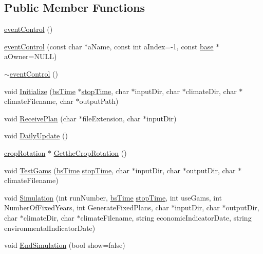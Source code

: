 \subsection*{Public Member Functions}
\begin{DoxyCompactItemize}
\item 
\hyperlink{classevent_control_a2e603f04482f16adc39d44adeb835aea}{eventControl} ()
\item 
\hyperlink{classevent_control_aa1a3811220714c42da10044e57034b7d}{eventControl} (const char $\ast$aName, const int aIndex=-\/1, const \hyperlink{classbase}{base} $\ast$aOwner=NULL)
\item 
\hyperlink{classevent_control_a9c9efcb383c5839f410c676e1379cfb3}{$\sim$eventControl} ()
\item 
void \hyperlink{classevent_control_abc86856c0212792527d036ac7cca53fb}{Initialize} (\hyperlink{classbs_time}{bsTime} $\ast$\hyperlink{bstime_8h_ab9daf2a60923b76e095ced77ee8785e3}{stopTime}, char $\ast$inputDir, char $\ast$climateDir, char $\ast$climateFilename, char $\ast$outputPath)
\item 
void \hyperlink{classevent_control_a47e163a529ae0e98fd83a31410731cde}{ReceivePlan} (char $\ast$fileExtension, char $\ast$inputDir)
\item 
void \hyperlink{classevent_control_a8fedd9f0953e05cbd39009bdd0b80387}{DailyUpdate} ()
\item 
\hyperlink{classcrop_rotation}{cropRotation} $\ast$ \hyperlink{classevent_control_aca3970196c2b30a5aa4a72952f829f20}{GettheCropRotation} ()
\item 
void \hyperlink{classevent_control_a4c270645b2751ad6c40fccd245455689}{TestGams} (\hyperlink{classbs_time}{bsTime} \hyperlink{bstime_8h_ab9daf2a60923b76e095ced77ee8785e3}{stopTime}, char $\ast$inputDir, char $\ast$outputDir, char $\ast$climateFilename)
\item 
void \hyperlink{classevent_control_a8def131d92f231393e486f28ff0cf00c}{Simulation} (int runNumber, \hyperlink{classbs_time}{bsTime} \hyperlink{bstime_8h_ab9daf2a60923b76e095ced77ee8785e3}{stopTime}, int useGams, int NumberOfFixedYears, int GenerateFixedPlans, char $\ast$inputDir, char $\ast$outputDir, char $\ast$climateDir, char $\ast$climateFilename, string economicIndicatorDate, string environmentalIndicatorDate)
\item 
void \hyperlink{classevent_control_a6f376cef3f9304a16b1d633ea4ac4770}{EndSimulation} (bool show=false)
\end{DoxyCompactItemize}


